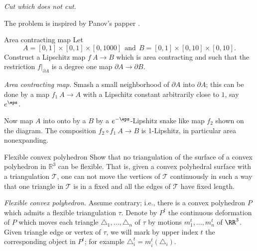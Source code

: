 
\textit{Cut which does not cut.}

 The problem is inspired by Panov's papper \cite{panov-torus}.







\begin{pr}{}{Area contracting map}\label{Area contracting map}
Let 
$$A=[0,1]\times[0,1]\times[0,1000]\ \ \text{and}\ \ B=[0,1]\times[0,10]\times[0,10].$$
Construct a Lipschitz map 
$f\:A\to B$ which is area contracting and such that the restriction $f|_{\partial A}$ 
is a degree one map $\partial A\to \partial B$.
\bigsign{\cite[\ref{guth-area-cnotractin}]{guth}}
\end{pr}


\textit{Area contracting map.}
Smash 
a small neighborhood of $\partial A$ into $\partial A$;
this can be done by a map $f_1\:A\to A$
with a Lipschitz constant arbitrarily close to $1$, say $e^\eps$.

Now map $A$ into onto by a  $B$ by a $e^{-\eps}$-Lipshitz snake like map $f_2$ shown on the diagram.
The composition $f_2\circ f_1\:A\to B$ is 1-Lipshitz, in particular area nonexpanding. 












\begin{pr}{\thm}{Flexible convex polyhedron}\label{Flexible convex polyhedron}
Show that no triangulation of the surface of a convex polyhedron in $\mathbb R^3$ 
can be flexible.
That is, given a convex polyhedral surface with a triangulation $\mathcal T$, one can not move the vertices of $\mathcal T$ continuously in such a way that one triangle in $\mathcal T$ is in a fixed
and 
all the edges of $\mathcal T$ have fixed length.
\end{pr}



\textit{Flexible convex polyhedron.}
Assume contrary; i.e., there is a convex polyhedron $P$ which admits a flexible triangulation $\tau$. 
Denote by $P^t$ the continuous deformation of $P$ which moves each triangle $\triangle_1,\dots,\triangle_n$ of $\tau$ 
by motions $m_1^t,\dots,m_n^t$ of $\RR^3$.
Given triangle edge or vertex of $\tau$, we will mark by upper index $t$ the corresponding object in $P^t$; 
for example $\triangle_i^t=m^t_i(\triangle_i)$.


